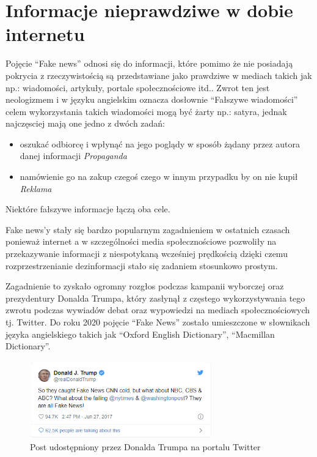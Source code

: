 \chapter{Informacje nieprawdziwe w dobie internetu}
Pojęcie ``Fake news'' odnosi się do 
informacji, które pomimo że nie posiadają pokrycia z rzeczywistością są 
przedstawiane jako prawdziwe w mediach takich jak np.: wiadomości, artykuły, 
portale społecznościowe itd.. 
Zwrot ten jest neologizmem i w języku angielskim oznacza dosłownie ``Fałszywe wiadomości''
celem wykorzystania takich wiadomości mogą być żarty np.: satyra, jednak najczęsciej 
mają one jedno z dwóch zadań:
\begin{itemize}
    \item oszukać odbiorcę i wpłynąć na jego poglądy w sposób żądany przez autora danej informacji \emph{Propaganda}
    \item namówienie go na zakup czegoś czego w innym przypadku by on nie kupił \emph{Reklama}
\end{itemize} 
Niektóre fałszywe informacje łączą oba cele.

Fake news'y stały się bardzo popularnym zagadnieniem w ostatnich czasach ponieważ
internet a w szczególności media społecznościowe pozwoliły na przekazywanie 
informacji z niespotykaną wcześniej prędkością dzięki czemu rozprzestrzenianie 
dezinformacji stało się zadaniem stosunkowo prostym.

Zagadnienie to zyskało ogromny rozgłos podczas kampanii wyborczej oraz
prezydentury Donalda Trumpa, który zasłynął z częstego wykorzystywania 
tego zwrotu podczas wywiadów debat oraz wypowiedzi na mediach społecznościowych
tj. Twitter.
Do roku 2020 pojęcie ``Fake News'' zostało umieszczone w słownikach języka angielskiego
takich jak ``Oxford English Dictionary'', ``Macmillan Dictionary''.
\begin{figure}[h!]
    \centering
    \includegraphics[width=0.7\textwidth]{./Img/Trump-Fake-News.png}
    \caption{Post udostępniony przez Donalda Trumpa na portalu Twitter}
\end{figure}

